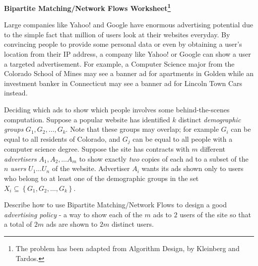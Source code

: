 \documentclass[12pt]{article}
\begin{document}
\newcommand{\I}{\mbox{{\em Int}}}
\newcommand{\lt}{\mbox{{\em left}}}
\newcommand{\rt}{\mbox{{\em right}}}
\newcommand{\ld}{\Delta^l}
\newcommand{\rd}{\Delta^r}
\newcommand{\lsp}[1]{\large\renewcommand{\baselinestretch}{#1}\normalsize}
\newcommand{\hsp}{\hspace{.2in}}

\def\Endwhile{\mbox{\bf endwhile\ }}
\def\Or{\mbox{\bf or\ }}
\def\Do{\mbox{\bf do\ }}
\def\Downto{\mbox{\bf downto\ }}
\def\Int{\mbox{\bf int\ }}
\def\To{\mbox{\bf to\ }}
\def\Repeat{\mbox{\bf repeat\ }}
\def\Until{\mbox{\bf until\ }}
\def\Return{\mbox{\bf return\ }}
\def\Not{\mbox{\bf not\ }}
\def\And{\mbox{\bf and\ }}
\def\For{\mbox{\bf for\ }}
\def\Foreach{\mbox{\bf foreach\ }}
\def\Else{\mbox{\bf else\ }}
\def\Elseif{\mbox{\bf elseif\ }}
\def\End{\mbox{\bf end\ }}
\def\If{\mbox{\bf if\ }}
\def\Mod{\mbox{\bf \ mod\ }}
\def\Then{\mbox{\bf then\ }}
\def\While{\mbox{\bf while\ }}
\def\Output{\mbox{\bf output\ }}

\lsp{1}
\pagestyle{plain}
\begin{center}
   {\bf
      Bipartite Matching/Network Flows Worksheet\footnote{The problem has been
         adapted from Algorithm Design, by Kleinberg and Tardos.}
   }
\end{center}

\begin{flushleft}
   Large companies like Yahoo! and Google have enormous advertising potential due
   to the simple fact that million of users look at their websites everyday.  By
   convincing people to provide some personal data or even by obtaining a user's
   location from their IP address, a company like Yahoo! or Google can show a user
   a targeted advertisement.  For example, a Computer Science major from the
   Colorado School of Mines may see a banner ad for apartments in Golden while an
   investment banker in Connecticut may see a banner ad for Lincoln Town Cars
   instead.

   Deciding which ads to show which people involves some behind-the-scenes
   computation.  Suppose a popular website has identified $k$ distinct
   \textit{demographic groups} $G_1, G_2, \ldots,G_k$.  Note that these groups may
   overlap; for example $G_i$ can be equal to all residents of Colorado, and $G_j$
   can be equal to all people with a computer science degree.  Suppose the site
   has contracts with $m$ different \textit{advertisers} $A_1, A_2, \ldots A_m$ to
   show exactly {\em two} copies of each ad to a subset of the $n$ {\em users}
   $U_1 \ldots U_n$ of the website.  Advertiser $A_i$ wants its ads shown only to
   users who belong to at least one of the demographic groups in the set
   $X_i\subseteq\left\lbrace G_1,G_2,\ldots,G_k\right\rbrace$.

   Describe how to use Bipartite Matching/Network Flows to design a good
   \textit{advertising policy} - a way to show each of the $m$ ads to $2$ users of
   the site so that a total of $2m$ ads are shown to $2m$ distinct users.
\end{flushleft}
\end{document}
